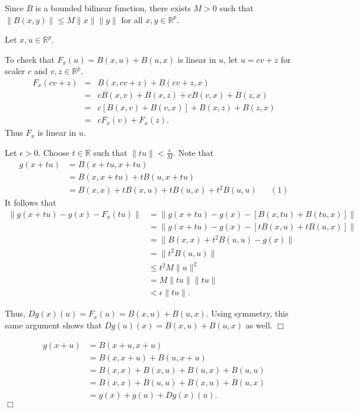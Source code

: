 \documentclass[11pt]{article}
\begin{document}
\vspace{.2in}

\noindent Since $B$ is a bounded bilinear function, there exists $M>0$ such that $\|B(x,y)\|\leq M\|x\|\|y\|$ for all $x,y\in\mathbb{R}^p$.
\vspace{.2in}

\noindent Let $x,u\in\mathbb{R}^p$.
\vspace{.2in}

\noindent {} To check that $F_x(u)=B(x,u)+B(u,x)$ is linear in $u$, let $u=cv+z$ for scaler $c$ and $v,z\in\mathbb{R}^p$.
\begin{eqnarray*}
F_x(cv+z)&=&B(x,cv+z)+B(cv+z,x)\\&=&cB(x,v)+B(x,z)+cB(v,x)+B(z,x)\\&=&c\left[B(x,v)+B(v,x)\right]+B(x,z)+B(z,x)\\&=&cF_x(v)+F_x(z).
\end{eqnarray*}
\noindent Thus $F_x$ is linear in $u$.

\vspace{.2in}

\noindent Let $\epsilon>0$. Choose $t\in\mathbb{R}$ such that $\|tu\|<\frac{\epsilon}{M}$. Note that
\begin{align*}
g(x+tu)&=B(x+tu,x+tu)\\&=B(x,x+tu)+tB(u,x+tu)\\&=B(x,x)+tB(x,u)+tB(u,x)+t^2B(u,u)&&(1)
\end{align*}
\noindent It follows that
\begin{align*}
\|g(x+tu)-g(x)-F_x(tu)\|&=\|g(x+tu)-g(x)-\left[B(x,tu)+B(tu,x)\right]\|\\&=\|g(x+tu)-g(x)-\left[tB(x,u)+tB(u,x)\right]\|\\&=\|B(x,x)+t^2B(u,u)-g(x)\|\\&=\|t^2B(u,u)\|\\&\leq t^2M\|u\|^2\\&=M\|tu\|\|tu\|\\&<\epsilon\|tu\|.
\end{align*}

\noindent Thus, $Dg(x)(u)=F_x(u)=B(x,u)+B(u,x)$. Using symmetry, this same argument shows that $Dg(u)(x)=B(x,u)+B(u,x)$ as well. \hfill $\Box$

\vspace{.2in}

\noindent {} \begin{align*}g(x+u)&=B(x+u,x+u)\\&=B(x,x+u)+B(u,x+u)\\&=B(x,x)+B(x,u)+B(u,x)+B(u,u)\\&=B(x,x)+B(u,u)+B(x,u)+B(u,x)\\&=g(x)+g(u)+Dg(x)(u).
\end{align*}
\hfill $\Box$
\end{document}
